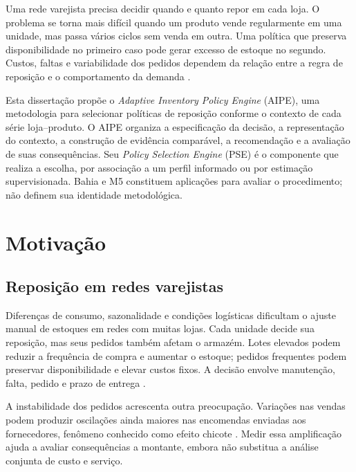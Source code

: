 
Uma rede varejista precisa decidir quando e quanto repor em cada loja. O problema se torna mais difícil quando um produto vende regularmente em uma unidade, mas passa vários ciclos sem venda em outra. Uma política que preserva disponibilidade no primeiro caso pode gerar excesso de estoque no segundo. Custos, faltas e variabilidade dos pedidos dependem da relação entre a regra de reposição e o comportamento da demanda \citep{Axsater2006InventoryControl,Syntetos2005Categorization}.

Esta dissertação propõe o \textit{Adaptive Inventory Policy Engine} (AIPE), uma metodologia para selecionar políticas de reposição conforme o contexto de cada série loja--produto. O AIPE organiza a especificação da decisão, a representação do contexto, a construção de evidência comparável, a recomendação e a avaliação de suas consequências. Seu \textit{Policy Selection Engine} (PSE) é o componente que realiza a escolha, por associação a um perfil informado ou por estimação supervisionada. Bahia e M5 constituem aplicações para avaliar o procedimento; não definem sua identidade metodológica.

\section{Motivação}

\subsection{Reposição em redes varejistas}

Diferenças de consumo, sazonalidade e condições logísticas dificultam o ajuste manual de estoques em redes com muitas lojas. Cada unidade decide sua reposição, mas seus pedidos também afetam o armazém. Lotes elevados podem reduzir a frequência de compra e aumentar o estoque; pedidos frequentes podem preservar disponibilidade e elevar custos fixos. A decisão envolve manutenção, falta, pedido e prazo de entrega \citep{Axsater2006InventoryControl,Zipkin2000FoundationsInventory}.

A instabilidade dos pedidos acrescenta outra preocupação. Variações nas vendas podem produzir oscilações ainda maiores nas encomendas enviadas aos fornecedores, fenômeno conhecido como efeito chicote \citep{LeePadmanabhanWhang1997Bullwhip}. Medir essa amplificação ajuda a avaliar consequências a montante, embora não substitua a análise conjunta de custo e serviço.

